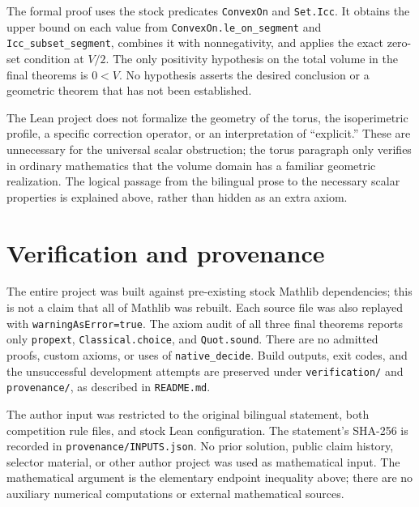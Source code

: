 \documentclass[11pt]{article}
\begin{document}
The formal proof uses the stock predicates \texttt{ConvexOn} and
\texttt{Set.Icc}. It obtains the upper bound on each value from
\texttt{ConvexOn.le\_on\_segment} and \texttt{Icc\_subset\_segment}, combines
it with nonnegativity, and applies the exact zero-set condition at $V/2$.
The only positivity hypothesis on the total volume in the final theorems is
$0<V$. No hypothesis asserts the desired conclusion or a geometric theorem
that has not been established.

The Lean project does not formalize the geometry of the torus, the
isoperimetric profile, a specific correction operator, or an interpretation
of ``explicit.'' These are unnecessary for the universal scalar obstruction;
the torus paragraph only verifies in ordinary mathematics that the volume
domain has a familiar geometric realization. The logical passage from the
bilingual prose to the necessary scalar properties is explained above,
rather than hidden as an extra axiom.

\section{Verification and provenance}
The entire project was built against pre-existing stock Mathlib dependencies;
this is not a claim that all of Mathlib was rebuilt. Each source file was also
replayed with \texttt{warningAsError=true}. The axiom audit of all three final
theorems reports only \texttt{propext}, \texttt{Classical.choice}, and
\texttt{Quot.sound}. There are no admitted proofs, custom axioms, or uses of
\texttt{native\_decide}. Build outputs, exit codes, and the unsuccessful
development attempts are preserved under \texttt{verification/} and
\texttt{provenance/}, as described in \texttt{README.md}.

The author input was restricted to the original bilingual statement, both
competition rule files, and stock Lean configuration. The statement's SHA-256
is recorded in \texttt{provenance/INPUTS.json}. No prior solution, public claim
history, selector material, or other author project was used as mathematical
input. The mathematical argument is the elementary endpoint inequality above;
there are no auxiliary numerical computations or external mathematical sources.
\end{document}
